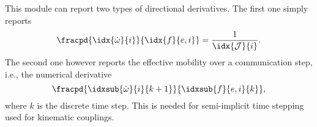 \documentclass[10pt,notitlepage,abstracton]{scrartcl}
\theoremstyle{plain}
\theoremstyle{plain}
\theoremstyle{plain}
\begin{document}
This module can report two types of directional derivatives.  The first one
simply reports
\begin{equation}
  \label{eq:7}
  \fracpd{\idx{\dot{\omega}}{i}}{\idx{f}{e,i}} =
  \frac{1}{\idx{\mathcal{J}}{i}}. 
\end{equation}
The second one however reports the effective mobility over a communication
step, i.e., the numerical derivative
\begin{equation}
  \label{eq:8}
  \fracpd{\idxsub{\dot{\omega}}{i}{k+1}}{\idxsub{f}{e,i}{k}}, 
\end{equation}
where $k$ is the discrete time step.   This is needed for semi-implicit
time stepping used for kinematic couplings. 



  

\end{document}
